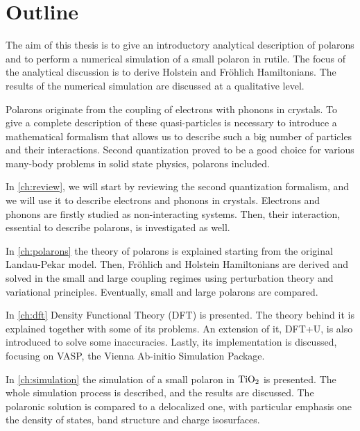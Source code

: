 \section*{Outline}
The aim of this thesis is to give an introductory analytical description of polarons and to perform a numerical simulation of a small polaron in rutile. The focus of the analytical discussion is to derive Holstein and Fröhlich Hamiltonians. The results of the numerical simulation are discussed at a qualitative level.

Polarons originate from the coupling of electrons with phonons in crystals. To give a complete description of these quasi-particles is necessary to introduce a mathematical formalism that allows us to describe such a big number of particles and their interactions. Second quantization proved to be a good choice for various many-body problems in solid state physics, polarons included.

In \cref{ch:review}, we will start by reviewing the second quantization formalism, and we will use it to describe electrons and phonons in crystals. Electrons and phonons are firstly studied as non-interacting systems. Then, their interaction, essential to describe polarons, is investigated as well.

In \cref{ch:polarons} the theory of polarons is explained starting from the original Landau-Pekar model. Then, Fr\"ohlich and Holstein Hamiltonians are derived and solved in the small and large coupling regimes using perturbation theory and variational principles. Eventually, small and large polarons are compared.

In \cref{ch:dft} Density Functional Theory (DFT) is presented. The theory behind it is explained together with some of its problems. An extension of it, DFT+U, is also introduced to solve some inaccuracies. Lastly, its implementation is discussed, focusing on VASP, the Vienna Ab-initio Simulation Package.

In \cref{ch:simulation} the simulation of a small polaron in $\ce{TiO_2}$ is presented. The whole simulation process is described, and the results are discussed. The polaronic solution is compared to a delocalized one, with particular emphasis one the density of states, band structure and charge isosurfaces.